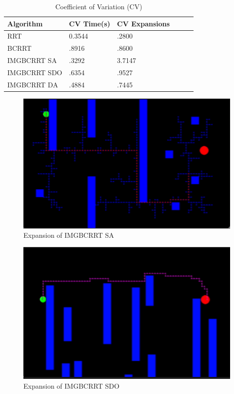 \documentclass{article}
\begin{document}
\begin{table}[h]
  \caption{Coefficient of Variation (CV)}
  \label{CV}
  \centering
  \begin{tabular}{llllll}
    \cmidrule(r){1-3}
   Algorithm  & CV Time(s) &  CV Expansions\\
    \midrule
    RRT & 0.3544 & .2800\\
    BCRRT & .8916 & .8600\\
    IMGBCRRT SA & .3292 & 3.7147\\
     IMGBCRRT SDO & .6354 & .9527\\
     IMGBCRRT DA  & .4884 & .7445\\
    \bottomrule
  \end{tabular}
\end{table}

\begin{figure}[h]
	\centerline{\includegraphics[scale=0.60]{IMGSA.png}}
        \caption{Expansion of IMGBCRRT SA}
\end{figure}

\begin{figure}[h]
	\centerline{\includegraphics[scale=0.70]{IMGSDO.png}}
        \caption{Expansion of IMGBCRRT SDO}
\end{figure}
\end{document}

